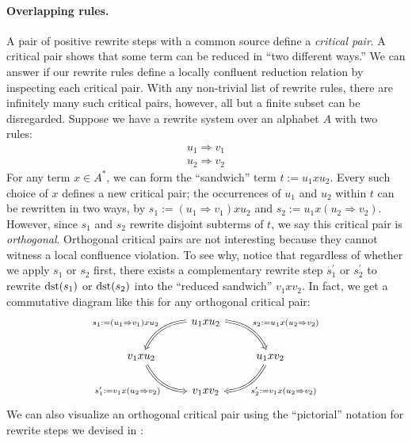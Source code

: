 \documentclass[../generics]{subfiles}
\begin{document}
\paragraph{Overlapping rules.} A pair of positive rewrite steps with a common source define a \emph{critical pair}. A critical pair shows that some term can be reduced in ``two different ways.'' We can answer if our rewrite rules define a locally confluent reduction relation by inspecting each critical pair. With any non-trivial list of rewrite rules, there are infinitely many such critical pairs, however, all but a finite subset can be disregarded. Suppose we have a rewrite system over an alphabet $A$ with two rules:
\begin{gather*}
u_1\Rightarrow v_1\\
u_2\Rightarrow v_2
\end{gather*}
For any term $x\in A^*$, we can form the ``sandwich'' term $t := u_1xu_2$. Every such choice of $x$ defines a new critical pair; the occurrences of $u_1$ and $u_2$ within $t$ can be rewritten in two ways, by $s_1 := (u_1\Rightarrow v_1)xu_2$ and $s_2 := u_1x(u_2\Rightarrow v_2)$. However, since $s_1$ and $s_2$ rewrite disjoint subterms of $t$, we say this critical pair is \emph{orthogonal}. Orthogonal critical pairs are not interesting because they cannot witness a local confluence violation. To see why, notice that regardless of whether we apply $s_1$ or $s_2$ first, there exists a complementary rewrite step $s_1^\prime$ or $s_2^\prime$ to rewrite $\operatorname{dst}(s_1)$ or $\operatorname{dst}(s_2)$ into the ``reduced sandwich'' $v_1xv_2$. In fact, we get a commutative diagram like this for any orthogonal critical pair:
\[
\begin{tikzcd}
&u_1xu_2\arrow[ld, Rightarrow, "s_1:=(u_1\Rightarrow v_1)xu_2"', bend right]\arrow[rd, Rightarrow, "s_2:=u_1x(u_2\Rightarrow v_2)", bend left]\\
v_1xu_2\arrow[rd, Rightarrow, "s_1^\prime := v_1x(u_2\Rightarrow v_2)"', bend right]&&u_1xv_2\arrow[ld, Rightarrow, "s_2^\prime:=v_1x(u_2\Rightarrow v_2)", bend left]\\
&v_1xv_2
\end{tikzcd}
\]
We can also visualize an orthogonal critical pair using the ``pictorial'' notation for rewrite steps we devised in :
\end{document}
